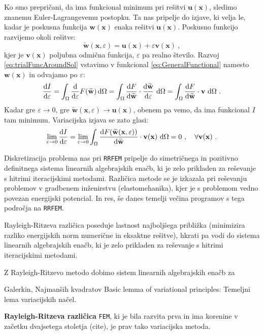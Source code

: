 Ko smo prepričani, da ima funkcional minimum pri rešitvi $\mathbf{u}(\mathbf{x})$, sledimo znanemu Euler-Lagrangevemu postopku. Ta nas pripelje do izjave, ki velja le, kadar je poskusna funkcija $\mathbf{w}(\mathbf{x})$ enaka rešitvi $\mathbf{u}(\mathbf{x})$. Poskusno funkcijo razvijemo okoli rešitve:
\begin{equation}
	\widetilde{\mathbf{w}}(\mathbf{x}, \varepsilon) = \mathbf{u}(\mathbf{x}) + \varepsilon \mathbf{v}(\mathbf{x}) \ ,
	\label{eq:trialFuncAroundSol}
\end{equation}
kjer je $\mathbf{v}(\mathbf{x})$ poljubna odmična funkcija, $\varepsilon$ pa realno število. Razvoj \eqref{eq:trialFuncAroundSol} vstavimo v funkcional \eqref{eq:GeneralFunctional} namesto $\mathbf{w}(\mathbf{x})$ in odvajamo po $\varepsilon$:
\begin{equation}
\frac{\mathrm{d} I}{\mathrm{d} \varepsilon} = \int_{\Omega} \frac{\mathrm{d}}{\mathrm{d} \varepsilon} F(\widetilde{\mathbf{w}}) \, \mathrm{d} \Omega = \int_{\Omega} \frac{\mathrm{d} F}{\mathrm{d} \widetilde{\mathbf{w}}} \cdot \frac{\mathrm{d} \widetilde{\mathbf{w}}}{\mathrm{d} \varepsilon} \ \mathrm{d} \Omega = \int_{\Omega} \frac{\mathrm{d} F}{\mathrm{d} \widetilde{\mathbf{w}}} \cdot \mathbf{v} \ \mathrm{d} \Omega \ .
\end{equation}
Kadar gre $\varepsilon \rightarrow 0$, gre $\widetilde{\mathbf{w}}(\mathbf{x}, \varepsilon) \rightarrow \mathbf{u}(\mathbf{x})$, obenem pa vemo, da ima funkcional $I$ tam minimum. Variacijska izjava se zato glasi:
\begin{equation}
	\lim_{\varepsilon \rightarrow 0} \frac{\ud I}{\ud \varepsilon} = \lim_{\varepsilon \rightarrow 0} \int_{\Omega} \frac{\ud F(\widetilde{\mathbf{w}}(\mathbf{x}, \varepsilon))}{\ud \widetilde{\mathbf{w}}} \cdot \mathbf{v(\mathbf{x})} \ \ud \Omega = 0 \ , \quad \forall \mathbf{v(\mathbf{x})} \ .
\end{equation}

Diskretizacija problema nas pri \texttt{RRFEM} pripelje do simetričnega in pozitivno definitnega sistema linearnih algebrajskih enačb, ki je zelo prikladen za reševanje s hitrimi iteracijskimi metodami. Različica metode se je izkazala pri reševanju problemov v gradbenem inženirstvu (elastomehanika), kjer je s problemom vedno povezan energijski potencial. In res, še danes temelji večina programov s tega področja na \texttt{RRFEM}. 

 Rayleigh-Ritzeva različica poseduje lastnost najboljšega približka (minimizira razliko energijskih norm numerične in eksaktne rešitve), hkrati pa vodi do sistema linearnih algebrajskih enačb, ki je zelo prikladen za reševanje s hitrimi iteracijskimi metodami.

Z Rayleigh-Ritzevo metodo dobimo sistem linearnih algebrajskih enačb za 

Galerkin, Najmanših kvadratov \cite{JiangB-LSFEM}
Basic lemma of variational principles: Temeljni lema variacijskih načel.

\textbf{Rayleigh-Ritzeva različica} \texttt{FEM}, ki je bila razvita prva in ima korenine v začetku dvajsetega stoletja (cite), je prav tako variacijska metoda.